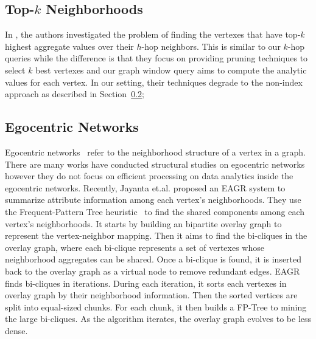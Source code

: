%

\subsection{Top-$k$ Neighborhoods}
In \cite{yan2010top}, the authors investigated the problem of finding the vertexes
that have top-$k$ highest aggregate values over their $h$-hop neighbors. 
This is similar to our $k$-hop queries while the difference is that they
focus on providing pruning techniques to select $k$ best vertexes and our graph
window query aims to compute the analytic values for each vertex. In our 
setting, their techniques degrade to the non-index approach as described in Section~\ref{};

%

\subsection{Egocentric Networks}
Egocentric networks~\cite{} refer to the neighborhood structure of a vertex
in a graph. There are many works have conducted structural studies on egocentric
networks however they do not focus on efficient processing on data analytics inside
the egocentric networks. Recently, Jayanta et.al. \cite{mondal2014eagr} 
proposed an EAGR system to summarize attribute information among 
each vertex's neighborhoods. They use the Frequent-Pattern Tree heuristic~\cite{} 
to find the shared components among each vertex's neighborhoods. It starts by building an
bipartite overlay graph to represent the vertex-neighbor mapping. Then it aims to
find the bi-cliques in the overlay graph, where
each bi-clique represents a set of vertexes whose neighborhood
aggregates can be shared. Once a bi-clique is found, it is inserted back to the overlay graph as
a virtual node to remove redundant edges. EAGR finds bi-cliques in iterations. During each iteration,
it sorts each vertexes in overlay graph by their neighborhood information. Then the sorted vertices 
are split into equal-sized chunks. For each chunk, it then builds a FP-Tree to mining the large bi-cliques. 
As the algorithm iterates, the overlay graph evolves to be less dense. 


